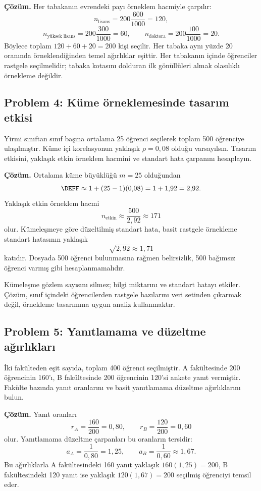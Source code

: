 \textbf{Çözüm.} Her tabakanın evrendeki payı örneklem hacmiyle çarpılır:
\[
n_{\text{lisans}}=200\frac{600}{1000}=120,
\]
\[
n_{\text{yüksek lisans}}=200\frac{300}{1000}=60,
\qquad
n_{\text{doktora}}=200\frac{100}{1000}=20.
\]
Böylece toplam $120+60+20=200$ kişi seçilir. Her tabaka aynı yüzde 20
oranında örneklendiğinden temel ağırlıklar eşittir. Her tabakanın içinde
öğrenciler rastgele seçilmelidir; tabaka kotasını dolduran ilk gönüllüleri
almak olasılıklı örnekleme değildir.

\subsection*{Problem 4: Küme örneklemesinde tasarım etkisi}

Yirmi sınıftan sınıf başına ortalama 25 öğrenci seçilerek toplam 500 öğrenciye
ulaşılmıştır. Küme içi korelasyonun yaklaşık $\rho=0{,}08$ olduğu varsayılsın.
Tasarım etkisini, yaklaşık etkin örneklem hacmini ve standart hata çarpanını
hesaplayın.

\textbf{Çözüm.} Ortalama küme büyüklüğü $m=25$ olduğundan
\[
\DEFF\approx1+(25-1)(0{,}08)=1+1{,}92=2{,}92.
\]
Yaklaşık etkin örneklem hacmi
\[
n_{\mathrm{etkin}}\approx\frac{500}{2{,}92}\approx171
\]
olur. Kümeleşmeye göre düzeltilmiş standart hata, basit rastgele örnekleme
standart hatasının yaklaşık
\[
\sqrt{2{,}92}\approx1{,}71
\]
katıdır. Dosyada 500 öğrenci bulunmasına rağmen belirsizlik, 500 bağımsız
öğrenci varmış gibi hesaplanmamalıdır.

\begin{mistakebox}
Kümeleşme gözlem sayısını silmez; bilgi miktarını ve standart hatayı etkiler.
Çözüm, sınıf içindeki öğrencilerden rastgele bazılarını veri setinden çıkarmak
değil, örnekleme tasarımına uygun analiz kullanmaktır.
\end{mistakebox}

\subsection*{Problem 5: Yanıtlamama ve düzeltme ağırlıkları}

İki fakülteden eşit sayıda, toplam 400 öğrenci seçilmiştir. A fakültesinde
200 öğrencinin 160'ı, B fakültesinde 200 öğrencinin 120'si ankete yanıt
vermiştir. Fakülte bazında yanıt oranlarını ve basit yanıtlamama düzeltme
ağırlıklarını bulun.

\textbf{Çözüm.} Yanıt oranları
\[
r_A=\frac{160}{200}=0{,}80,
\qquad
r_B=\frac{120}{200}=0{,}60
\]
olur. Yanıtlamama düzeltme çarpanları bu oranların tersidir:
\[
a_A=\frac{1}{0{,}80}=1{,}25,
\qquad
a_B=\frac{1}{0{,}60}\approx1{,}67.
\]
Bu ağırlıklarla A fakültesindeki 160 yanıt yaklaşık $160(1{,}25)=200$, B
fakültesindeki 120 yanıt ise yaklaşık $120(1{,}67)=200$ seçilmiş öğrenciyi
temsil eder.

